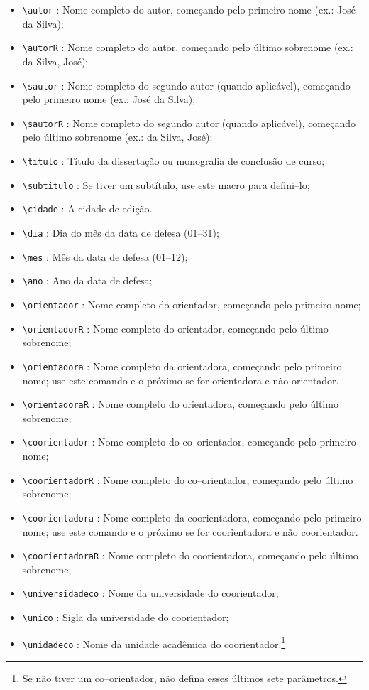  \begin{itemize}%
\item \verb|\autor| : Nome completo do autor, começando pelo primeiro nome (ex.: José da Silva);
\item \verb|\autorR| : Nome completo do autor, começando pelo último sobrenome (ex.: da Silva, José);
\item \verb|\sautor| : Nome completo do segundo autor (quando aplicável), começando pelo primeiro nome (ex.: José da Silva);
\item \verb|\sautorR| : Nome completo do segundo autor (quando aplicável), começando pelo último sobrenome (ex.: da Silva, José);
\item \verb|\titulo| : Título da dissertação ou monografia de conclusão de curso;
\item \verb|\subtitulo| : Se tiver um subtítulo, use este macro para defini--lo;

\item \verb|\cidade| : A cidade de edição. 
\item \verb|\dia| : Dia do mês da data de defesa (01--31);
\item \verb|\mes| : Mês da data de defesa (01--12);
\item \verb|\ano| : Ano da data de defesa;

\item \verb|\orientador| : Nome completo do orientador, começando pelo primeiro nome;
\item \verb|\orientadorR| : Nome completo do orientador, começando pelo último sobrenome;

\item \verb|\orientadora| : Nome completo da orientadora, começando pelo primeiro nome; use este comando e o próximo se for orientadora e não orientador.
\item \verb|\orientadoraR| : Nome completo do orientadora, começando pelo último sobrenome;

\item \verb|\coorientador| : Nome completo do co--orientador, começando pelo primeiro nome;
\item \verb|\coorientadorR| : Nome completo do co--orientador, começando pelo último sobrenome;

\item \verb|\coorientadora| : Nome completo da coorientadora, começando pelo primeiro nome; use este comando e o próximo se for coorientadora e não coorientador.
\item \verb|\coorientadoraR| : Nome completo do coorientadora, começando pelo último sobrenome;

\item \verb|\universidadeco| : Nome da universidade do coorientador;
\item \verb|\unico| : Sigla da universidade do coorientador;
\item \verb|\unidadeco| : Nome da unidade acadêmica do coorientador.\footnote{Se não tiver um co--orientador, não defina esses últimos sete parâmetros.}
\end{itemize}

